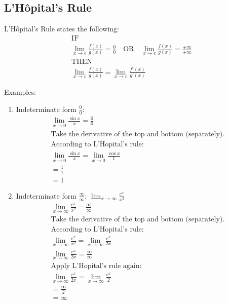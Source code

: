 \documentclass[12pt]{article}
\begin{document}
\subsection{L'Hôpital's Rule} %
\noindent L'Hôpital's Rule states the following:
\begin{gather*}
	\text{IF} \\
	\lim_{x \to c} \frac{f(x)}{g(x)} = \frac{0}{0} \quad \text{OR} \quad \lim_{x \to c} \frac{f(x)}{g(x)} = \frac{\pm \infty}{\pm \infty} \\[6pt]
	\text{THEN} \\
	\lim_{x \to c} \frac{f(x)}{g(x)} = \lim_{x \to c} \frac{f'(x)}{g'(x)}
\end{gather*}

\noindent Examples:
\begin{enumerate}
	\item Indeterminate form $\frac{0}{0}$:
	      \begin{gather*}
		      \lim_{x \to 0} \frac{\sin{x}}{x} = \frac{0}{0} \\[6pt]
		      \text{Take the derivative of the top and bottom (separately).}\\
		      \text{According to L'Hopital's rule:} \\
		      \lim_{x \to 0} \frac{\sin{x}}{x} = \lim_{x \to 0} \frac{\cos{x}}{1} \\[6pt]
		      = \frac{1}{1} \\[6pt]
		      = 1
	      \end{gather*}

	\item Indeterminate form $\frac{\infty}{\infty}$: $\lim_{x \to \infty} \frac{e^x}{x^2}$
	      \begin{gather*}
		      \lim_{x \to \infty} \frac{e^x}{x^2} = \frac{\infty}{\infty} \\[6pt]
		      \text{Take the derivative of the top and bottom (separately).}\\
		      \text{According to L'Hopital's rule:} \\
		      \lim_{x \to \infty} \frac{e^x}{x^2} = \lim_{x \to \infty} \frac{e^x}{2x} \\[6pt]
		      \lim_{x \to \infty} \frac{e^x}{2x} = \frac{\infty}{\infty} \\[6pt]
		      \text{Apply L'Hopital's rule again:} \\
		      \lim_{x \to \infty} \frac{e^x}{2x} = \lim_{x \to \infty} \frac{e^x}{2} \\[6pt]
		      = \frac{\infty}{2} \\[6pt]
		      = \infty
	      \end{gather*}
\end{enumerate}
\end{document}
